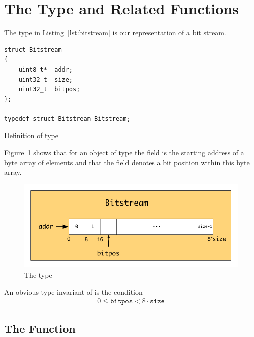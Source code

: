 \section{The Type \bitstream and Related Functions}

The type \bitstream in Listing~\ref{lst:bitstream} is our \isoc representation of a bit stream.


\begin{listing}[hbt]
\begin{center}
\begin{lstlisting}[style=acsl-block]
struct Bitstream
{
    uint8_t*  addr;
    uint32_t  size;
    uint32_t  bitpos;
};

typedef struct Bitstream Bitstream;
\end{lstlisting}
\end{center}
\caption{\label{lst:bitstream} Definition of type \bitstream}
\end{listing}

Figure~\ref{fig:bit-stream-type}  shows that for an object of type \bitstream the field  is the
starting address of a byte array of  elements and that the field 
denotes a bit position within this byte array.

\begin{figure}[hbt]
\begin{center}
\includegraphics[scale=0.85]{Figures/bit-stream-type.pdf}
\caption{The type \bitstream}
\label{fig:bit-stream-type}
\end{center}
\end{figure}

An obvious type invariant of \bitstream is the condition
\begin{align}
\label{eq:bit-stream-invariant}
    0 \leq \mathtt{bitpos} < 8 \cdot \mathtt{size}
\end{align}

\clearpage

\subsection{The Function \bitstreamread}


